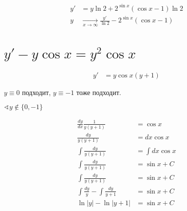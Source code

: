 \begin{align*}
    y' & = y\ln 2 + 2^{\sin x}(\cos x - 1)\ln 2                                \\
    y  & \xrightarrow[x\to \infty]{} \frac{y'}{\ln 2} - 2^{\sin x}(\cos x - 1)
\end{align*}

\section*{$y'-y\cos x = y^2 \cos x$}

\begin{align*}
    y' & = y\cos x(y+1)
\end{align*}

$y \equiv 0$ подходит, $y\equiv -1$ тоже подходит.

$\sphericalangle y\not\in\{0, -1\}$

\begin{align*}
    \frac{dy}{dx}\frac{1}{y(y+1)}           & = \cos x        \\
    \frac{dy}{y(y+1)}                       & = dx\cos x      \\
    \int \frac{dy}{y(y+1)}                  & = \int dx\cos x \\
    \int \frac{dy}{y(y+1)}                  & = \sin x + C    \\
    \int \frac{dy}{y(y+1)}                  & = \sin x + C    \\
    \int \frac{dy}{y} - \int \frac{dy}{y+1} & = \sin x + C    \\
    \ln |y| - \ln|y+1|                      & = \sin x + C    \\
\end{align*}

